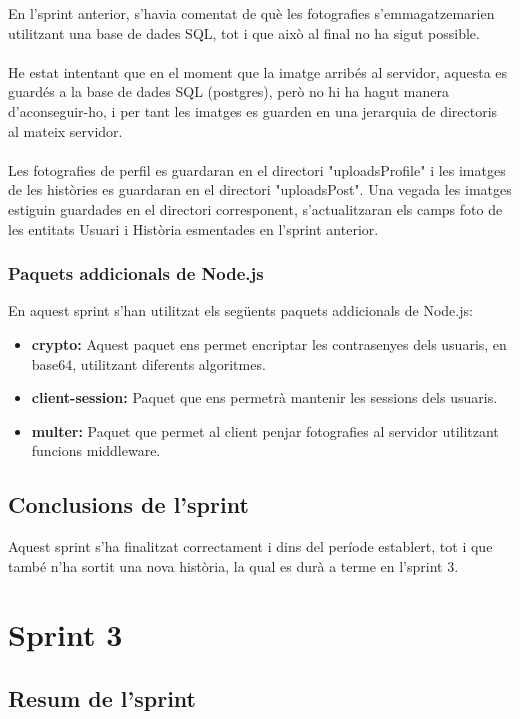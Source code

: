 \documentclass[11pt,catalan,listoffigures,listoftables]{tfgetsinf}
\begin{document}
En l'sprint anterior, s'havia comentat de què les fotografies s'emmagatzemarien utilitzant una base de dades SQL, tot i que això al final no ha sigut possible.\\ \\
He estat intentant que en el moment que la imatge arribés al servidor, aquesta es guardés a la base de dades SQL (postgres), però no hi ha hagut manera d'aconseguir-ho, i per tant les imatges es guarden en una jerarquia de directoris al mateix servidor.\\ \\
Les fotografies de perfil es guardaran en el directori "uploadsProfile" i les imatges de les històries es guardaran en el directori "uploadsPost". Una vegada les imatges estiguin guardades en el directori corresponent, s'actualitzaran els camps foto de les entitats Usuari i Història esmentades en l'sprint anterior.

\subsubsection{Paquets addicionals de Node.js}

En aquest sprint s'han utilitzat els següents paquets addicionals de Node.js:
\begin{itemize}
\item \textbf{crypto:} Aquest paquet ens permet encriptar les contrasenyes dels usuaris, en base64, utilitzant diferents algoritmes.
\item \textbf{client-session:} Paquet que ens permetrà mantenir les sessions dels usuaris.
\item \textbf{multer:} Paquet que permet al client penjar fotografies al servidor utilitzant funcions middleware.
\end{itemize}

\subsection{Conclusions de l'sprint}

Aquest sprint s'ha finalitzat correctament i dins del període establert, tot i que també n'ha sortit una nova història, la qual es durà a terme en l'sprint 3.

\section{Sprint 3}

\subsection{Resum de l'sprint}
\end{document}
